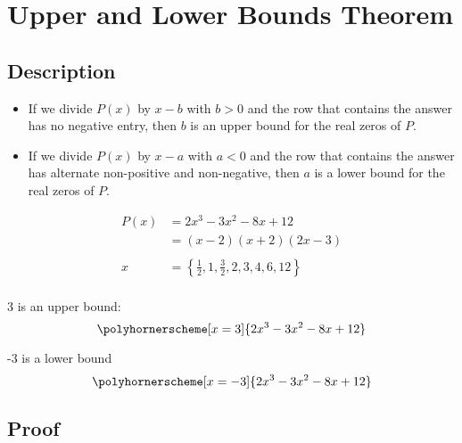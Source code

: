 \documentclass{exam}
\begin{document}
  \section{Upper and Lower Bounds Theorem}

  \subsection{Description}

  \begin{itemize}
    \item If we divide $P(x)$ by $x - b$ with $b > 0$ and the row that contains the answer has no negative entry, then
      $b$ is an upper bound for the real zeros of $P$.

    \item If we divide $P(x)$ by $x - a$ with $a < 0$ and the row that contains the answer has alternate non-positive and
      non-negative, then $a$ is a lower bound for the real zeros of $P$.

  \end{itemize}

  \begin{align*}
    P(x)    &= 2 x^3 - 3 x^2 - 8 x + 12 \\
            &= (x-2) (x+2) (2 x-3) \\
    \\
    x       &= \left\{ \frac{1}{2},1,\frac{3}{2},2,3,4,6,12 \right\} \\
  \end{align*}

  3 is an upper bound:
  \[ \polyhornerscheme[x = 3]{2 x^3 - 3 x^2 - 8 x + 12} \]

  -3 is a lower bound
  \[ \polyhornerscheme[x = -3]{2 x^3 - 3 x^2 - 8 x + 12} \]

  \subsection{Proof}
\end{document}
